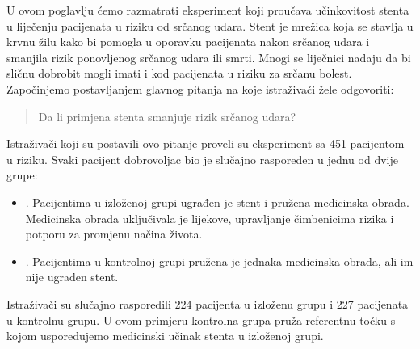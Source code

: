 U ovom poglavlju ćemo razmatrati eksperiment koji proučava učinkovitost stenta u liječenju pacijenata u riziku od srčanog udara.
Stent je mrežica koja se stavlja u krvnu žilu kako bi pomogla u oporavku pacijenata nakon srčanog udara i smanjila rizik ponovljenog srčanog udara ili smrti. Mnogi se liječnici nadaju da bi sličnu dobrobit mogli imati i kod pacijenata u riziku za srčanu bolest. Započinjemo postavljanjem glavnog pitanja na koje istraživači žele odgovoriti:
\begin{quote}
	Da li primjena stenta smanjuje rizik srčanog udara?
\end{quote}

Istraživači koji su postavili ovo pitanje proveli su eksperiment sa 451 pacijentom u riziku. Svaki pacijent dobrovoljac bio je slučajno raspoređen u jednu od dvije grupe:
\begin{itemize}
	\item[]. Pacijentima u izloženoj grupi ugrađen je stent i pružena medicinska obrada. Medicinska obrada uključivala je lijekove, upravljanje čimbenicima rizika i potporu za promjenu načina života.
	\item[]. Pacijentima u kontrolnoj grupi pružena je jednaka medicinska obrada, ali im nije ugrađen stent.
\end{itemize}
Istraživači su slučajno rasporedili 224 pacijenta u izloženu grupu i 227 pacijenata u kontrolnu grupu. U ovom primjeru kontrolna grupa pruža referentnu točku s kojom uspoređujemo medicinski učinak stenta u izloženoj grupi.

